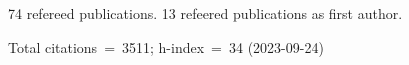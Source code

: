 74 refereed publications. 13 refeered publications as first author.

Total citations~=~3511; h-index~=~34 (2023-09-24)